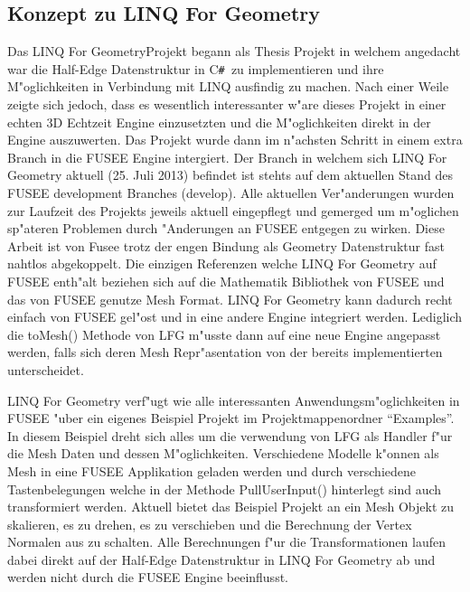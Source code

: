 \documentclass[pagesize, paper=a4, fontsize=12pt,titlepage=true, headings=small, headnosepline, abstractoff, liststotoc, nochapterprefix, plainheadsepline]{scrreprt}
\newcommand{\CSS}{C\texttt{\# }}
\newcommand{\LFG}{LINQ For Geometry}
\newcommand{\LFGS}{LINQ For Geometry }
\newcommand{\HES}{Half-Edge Datenstruktur }
\begin{document}
		\subsection {Konzept zu \LFG}
			Das \LFG Projekt begann als Thesis Projekt in welchem angedacht war die \HES in \CSS zu implementieren und ihre M"oglichkeiten in Verbindung mit LINQ ausfindig zu machen. Nach einer Weile zeigte sich jedoch, dass es wesentlich interessanter w"are dieses Projekt in einer echten 3D Echtzeit Engine einzusetzten und die M"oglichkeiten direkt in der Engine auszuwerten. Das Projekt wurde dann im n"achsten Schritt in einem extra Branch in die FUSEE Engine intergiert. Der Branch in welchem sich \LFGS aktuell (25. Juli 2013) befindet ist stehts auf dem aktuellen Stand des FUSEE development Branches (develop). Alle aktuellen Ver"anderungen wurden zur Laufzeit des Projekts jeweils aktuell eingepflegt und gemerged um m"oglichen sp"ateren Problemen durch "Anderungen an FUSEE entgegen zu wirken. Diese Arbeit ist von Fusee trotz der engen Bindung als Geometry Datenstruktur fast nahtlos abgekoppelt. Die einzigen Referenzen welche \LFGS auf FUSEE enth"alt beziehen sich auf die Mathematik Bibliothek von FUSEE und das von FUSEE genutze Mesh Format. \LFGS kann dadurch recht einfach von FUSEE gel"ost und in eine andere Engine integriert werden. Lediglich die toMesh() Methode von LFG m"usste dann auf eine neue Engine angepasst werden, falls sich deren Mesh Repr"asentation von der bereits implementierten unterscheidet.
\newline

\LFGS verf"ugt wie alle interessanten Anwendungsm"oglichkeiten in FUSEE "uber ein eigenes Beispiel Projekt im Projektmappenordner "`Examples"'. In diesem Beispiel dreht sich alles um die verwendung von LFG als Handler f"ur die Mesh Daten und dessen M"oglichkeiten. Verschiedene Modelle k"onnen als Mesh in eine FUSEE Applikation geladen werden und durch verschiedene Tastenbelegungen welche in der Methode  PullUserInput() hinterlegt sind auch transformiert werden. Aktuell bietet das Beispiel Projekt an ein Mesh Objekt zu skalieren, es zu drehen, es zu verschieben und die Berechnung der Vertex Normalen aus zu schalten. Alle Berechnungen f"ur die Transformationen laufen dabei direkt auf der \HES in \LFGS ab und werden nicht durch die FUSEE Engine beeinflusst.
\newline
\end{document}
